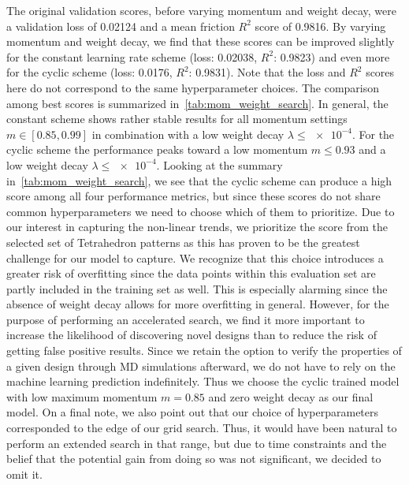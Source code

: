 The original validation scores, before varying momentum and weight decay, were a
validation loss of 0.02124 and a mean friction $R^2$ score of 0.9816. By varying
momentum and weight decay, we find that these scores can be improved slightly
for the constant learning rate scheme (loss: 0.02038, $R^2$: 0.9823) and even
more for the cyclic scheme (loss: 0.0176, $R^2$: 0.9831). Note that the loss and
$R^2$ scores here do not correspond to the same hyperparameter choices. The
comparison among best scores is summarized in~\cref{tab:mom_weight_search}. In
general, the constant scheme shows rather stable results for all momentum
settings $m \in [0.85, 0.99]$ in combination with a low weight decay $\lambda
\le \num{e-4}$. For the cyclic scheme the performance peaks toward a low
momentum $m \le 0.93$ and a low weight decay $\lambda \le \num{e-4}$. Looking at
the summary in~\cref{tab:mom_weight_search}, we see that the cyclic scheme can
produce a high score among all four performance metrics, but since these scores
do not share common hyperparameters we need to choose which of them to
prioritize. Due to our interest in capturing the non-linear trends, we
prioritize the score from the selected set of Tetrahedron patterns as this has
proven to be the greatest challenge for our model to capture. We recognize that this
choice introduces a greater risk of overfitting since the data points within
this evaluation set are partly included in the training set as well. This is
especially alarming since the absence of weight decay allows for more
overfitting in general. However, for the purpose of performing an accelerated
search, we find it more important to increase the likelihood of discovering
novel designs than to reduce the risk of getting false positive results. Since
we retain the option to verify the properties of a given design through
\acrshort{MD} simulations afterward, we do not have to rely on the machine
learning prediction indefinitely. Thus we choose the cyclic trained model with
low maximum momentum $m = 0.85$ and zero weight decay as our final model. On a final
note, we also point out that our choice of hyperparameters corresponded to the
edge of our grid search. Thus, it would have been natural to perform an extended
search in that range, but due to time constraints and the belief that the potential gain from doing so was not significant, we decided to omit it.


